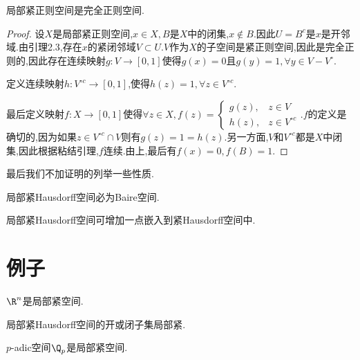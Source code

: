 \documentclass{article}
\begin{document}
\begin{theorem}
    局部紧正则空间是完全正则空间.
\end{theorem}
\begin{proof}
    设$X$是局部紧正则空间,$x\in X, B$是$X$中的闭集,$x\notin B$.因此$U=B^c$是$x$是开邻域.由引理2.3,存在$x$的紧闭邻域$V\subset U$.$V$作为$X$的子空间是紧正则空间,因此是完全正则的,因此存在连续映射$g:V\to [0,1]$使得$g(x)=0$且$g(y)=1, \forall y\in V-V^\circ$.

    定义连续映射$h:V^{\circ c}\to [0,1]$,使得$h(z)=1,\forall z\in V^{\circ c}$.

    最后定义映射$f:X\to [0,1]$使得$\forall z\in X, f(z)=\begin{cases}
        g(z),& z\in V\\ h(z),&z\in V^{\circ c}
    \end{cases}$.$f$的定义是确切的,因为如果$z\in V^{\circ c}\cap V$则有$g(z)=1=h(z)$.另一方面,$V$和$V^{\circ c}$都是$X$中闭集,因此根据粘结引理,$f$连续.由上,最后有$f(x)=0, f(B)=1$.
\end{proof}

最后我们不加证明的列举一些性质.
\begin{theorem}
    局部紧Hausdorff空间必为Baire空间.
\end{theorem}
\begin{theorem}
    局部紧Hausdorff空间可增加一点嵌入到紧Hausdorff空间中.
\end{theorem}

\section{例子}
\begin{example}
    $\R^n$是局部紧空间.
\end{example}
\begin{example}
    局部紧Hausdorff空间的开或闭子集局部紧.
\end{example}
\begin{example}
    $p$-adic空间$\Q_p$是局部紧空间.
\end{example}
\end{document}
